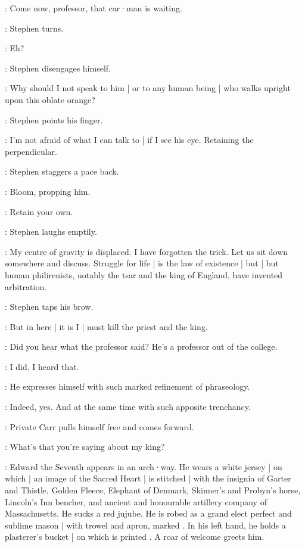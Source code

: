 \Bloom:
Come now,
professor,
that car·man is waiting.

:
Stephen turns.

\Stephen:
Eh?

:
Stephen disengages himself.

\Stephen:
Why should I not speak to him |
or to any human being |
who walks upright upon this oblate orange?

:
Stephen points his finger.

\Stephen:
I'm not afraid of what I can talk to |
if I see his eye.
Retaining the perpendicular.

:
Stephen staggers a pace back.

:
Bloom,
propping him.

\Bloom:
Retain your own.

:
Stephen laughs emptily.

\Stephen:
My centre of gravity is displaced.
I have forgotten the trick.
Let us sit down somewhere and discuss.
Struggle for life |
is the law of existence |
but |
but human philirenists,
notably the tsar and the king of England,
have invented arbitration.

:
Stephen taps his brow.

\Stephen:
But in here |
it is I |
must kill the priest and the king.

\BiddyClap[7a]:
Did you hear what the professor said?
He's a professor out of the college.

\CuntyKate[7a]:
I did.
I heard that.

\BiddyClap[7a]:
He expresses himself with such marked refinement of phraseology.

\CuntyKate[7a]:
Indeed,
yes.
And at the same time with such apposite trenchancy.

:
Private Carr pulls himself free and comes forward.

\Carr:
What's that you're saying about my king?

:
Edward the Seventh appears in an arch·way.
He wears a white jersey |
on which |
an image
of the Sacred Heart |
%
is stitched |
with the insignia of Garter and Thistle,
Golden Fleece,
Elephant of Denmark,
Skinner's and Probyn's horse,
Lincoln's Inn bencher,
and ancient and honourable artillery company of Massachusetts.
He sucks a red jujube.
He is robed as a grand elect perfect and sublime mason |
with trowel and apron,
marked .
In his left hand,
he holds a plasterer's bucket |
on which is printed .
A roar of welcome greets him.

